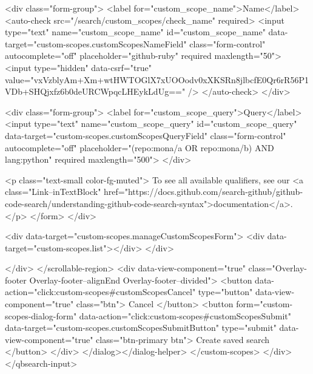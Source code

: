           <div class="form-group">
            <label for="custom_scope_name">Name</label>
            <auto-check src="/search/custom_scopes/check_name" required>
              <input
                type="text"
                name="custom_scope_name"
                id="custom_scope_name"
                data-target="custom-scopes.customScopesNameField"
                class="form-control"
                autocomplete="off"
                placeholder="github-ruby"
                required
                maxlength="50">
              <input type="hidden" data-csrf="true" value="vxVzblyAm+Xm+wtHWTOGlX7xUOOodv0xXKSRn8jlbcfE0Qr6rR56P1VDb+SHQjxfz6b0deURCWpqcLHEykLdUg==" />
            </auto-check>
          </div>

          <div class="form-group">
            <label for="custom_scope_query">Query</label>
            <input
              type="text"
              name="custom_scope_query"
              id="custom_scope_query"
              data-target="custom-scopes.customScopesQueryField"
              class="form-control"
              autocomplete="off"
              placeholder="(repo:mona/a OR repo:mona/b) AND lang:python"
              required
              maxlength="500">
          </div>

          <p class="text-small color-fg-muted">
            To see all available qualifiers, see our <a class="Link--inTextBlock" href="https://docs.github.com/search-github/github-code-search/understanding-github-code-search-syntax">documentation</a>.
          </p>
</form>        </div>

        <div data-target="custom-scopes.manageCustomScopesForm">
          <div data-target="custom-scopes.list"></div>
        </div>

</div>
      </scrollable-region>
      <div data-view-component="true" class="Overlay-footer Overlay-footer--alignEnd Overlay-footer--divided">          <button data-action="click:custom-scopes#customScopesCancel" type="button" data-view-component="true" class="btn">    Cancel
</button>
          <button form="custom-scopes-dialog-form" data-action="click:custom-scopes#customScopesSubmit" data-target="custom-scopes.customScopesSubmitButton" type="submit" data-view-component="true" class="btn-primary btn">    Create saved search
</button>
</div>
</dialog></dialog-helper>
    </custom-scopes>
  </div>
</qbsearch-input>


